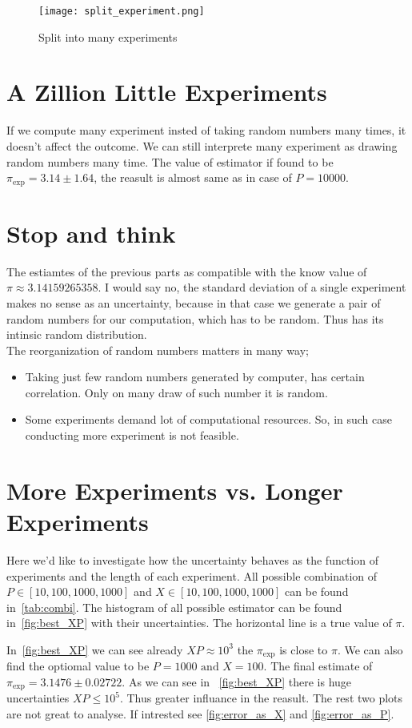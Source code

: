 \documentclass[titlepage]{scrartcl}
\begin{document}
\begin{figure}
    \centering
    \texttt{[image: split\_experiment.png]}
    \caption[OBE]{Split into many experiments}\label{fig:split_experiment}
\end{figure}

\section{A Zillion Little Experiments}
If we compute many experiment insted of taking random numbers many times, it doesn't affect the outcome. We can still interprete many 
experiment as drawing random numbers many time. The value of estimator if found to be $\pi_{\exp} = 3.14 \pm 1.64 $, the reasult is 
almost same as in case of $P = 10000$.

\section{Stop and think}
The estiamtes of the previous parts as compatible with the know value of $\pi \approx 3.14159265358$.
I would say no, the standard deviation of a single experiment makes no sense as an uncertainty, because in that case we generate a pair of
random numbers for our computation, which has to be random. Thus has its intinsic random distribution.\\
The reorganization of random numbers matters in many way;
\begin{itemize}
    \item Taking just few random numbers generated by computer, has certain correlation. Only on many draw of such number it is random.
    \item Some experiments demand lot of computational resources. So, in such case conducting more experiment is not feasible. 
\end{itemize}

\section{More Experiments vs. Longer Experiments}
Here we'd like to investigate how the uncertainty behaves as the function of experiments and the length of each experiment. 
All possible combination of $P \in [10,100,1000,1000]$ and $X\in[10,100,1000,1000]$ can be found in~\cref{tab:combi}. The histogram of
all possible estimator can be found in~\cref{fig:best_XP} with their uncertainties. The horizontal line is a true value of $\pi$.\par
In~\cref{fig:best_XP} we can see already $ XP \approx 10^3 $ the $\pi_{\exp}$ is close to $\pi$. We can also find the optiomal value to
be $P =1000 \text{ and } X = 100$. The final estimate of $\pi_{\exp}= 3.1476 \pm 0.02722$. As we can see in ~\cref{fig:best_XP} there
is huge uncertainties $XP\le10^5$. Thus greater influance in the reasult. The rest two plots are not great to analyse. If intrested see
\cref{fig:error_as_X} and \cref{fig:error_as_P}.
\end{document}
